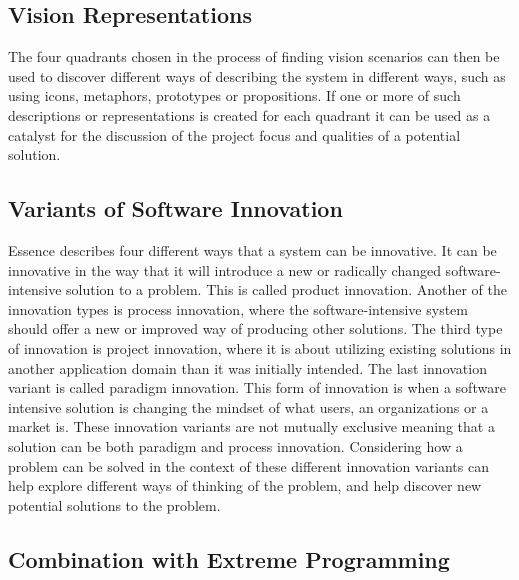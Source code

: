 \subsection{Vision Representations}
\label{sub:vision_representations}

The four quadrants chosen in the process of finding vision scenarios can then be used to discover different ways of describing the system in different ways, such as using icons, metaphors, prototypes or propositions. If one or more of such descriptions or representations is created for each quadrant it can be used as a catalyst for the discussion of the project focus and qualities of a potential solution. 

\subsection{Variants of Software Innovation}
\label{sub:essence_innovation_variants}

Essence describes four different ways that a system can be innovative. It can be innovative in the way that it will introduce a new or radically changed software-intensive solution to a problem. This is called product innovation. Another of the innovation types is process innovation, where the software-intensive system should offer a new or improved way of producing other solutions. The third type of innovation is project innovation, where it is about utilizing existing solutions in another application domain than it was initially intended. The last innovation variant is called paradigm innovation. This form of innovation is when a software intensive solution is changing the mindset of what users, an organizations or a market is. These innovation variants are not mutually exclusive meaning that a solution can be both paradigm and process innovation. Considering how a problem can be solved in the context of these different innovation variants can help explore different ways of thinking of the problem, and help discover new potential solutions to the problem.


\subsection{Combination with Extreme Programming}
\label{sub:combination_with_extreme_programming}

